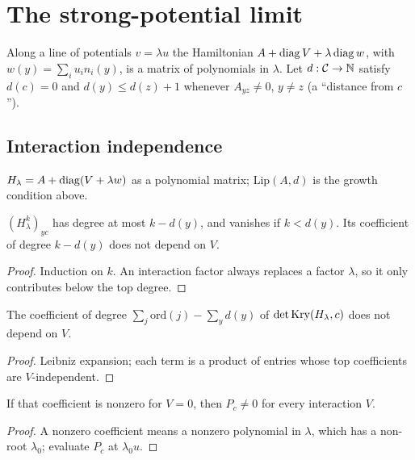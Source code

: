 \chapter{The strong-potential limit}
\label{chap:strong}

Along a line of potentials $v=\lambda u$ the Hamiltonian $A+\operatorname{diag} V+\lambda\operatorname{diag} w$, with
$w(y)=\sum_iu_in_i(y)$, is a matrix of polynomials in $\lambda$. Let $d:\mathcal{C}\to\mathbb{N}$ satisfy $d(c)=0$ and
$d(y)\le d(z)+1$ whenever $A_{yz}\neq0$, $y\ne z$ (a ``distance from $c$'').

\section{Interaction independence}

\begin{definition}
  \label{def:Hl}
  \leanok
  $H_\lambda=A+\operatorname{diag}(V+\lambda w)$ as a polynomial matrix; $\mathrm{Lip}(A,d)$ is the growth condition above.
\end{definition}

\begin{theorem}
  \label{thm:entry_top}
  \leanok
  $(H_\lambda^k)_{yc}$ has degree at most $k-d(y)$, and vanishes if $k<d(y)$. Its coefficient of degree
  $k-d(y)$ does not depend on $V$.
\end{theorem}
\begin{proof}
  \leanok
  Induction on $k$. An interaction factor always replaces a factor $\lambda$, so it only contributes below
  the top degree.
\end{proof}

\begin{theorem}
  \label{thm:det_top}
  \leanok
  The coefficient of degree $\sum_j\mathrm{ord}(j)-\sum_yd(y)$ of $\det\operatorname{Kry}(H_\lambda,c)$ does not depend on $V$.
\end{theorem}
\begin{proof}
  \leanok
  Leibniz expansion; each term is a product of entries whose top coefficients are $V$-independent.
\end{proof}

\begin{theorem}
  \label{thm:krylovPoly_ne_zero_of_top}
  \leanok
  If that coefficient is nonzero for $V=0$, then $P_c\neq0$ for every interaction $V$.
\end{theorem}
\begin{proof}
  \leanok
  A nonzero coefficient means a nonzero polynomial in $\lambda$, which has a non-root $\lambda_0$; evaluate
  $P_c$ at $\lambda_0u$.
\end{proof}

